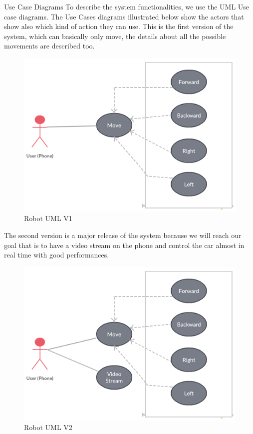 \documentclass[xcolor=table, 9pt]{beamer}
\begin{document}

\begin{frame}{Use Case Diagrams}
To describe the system functionalities, we use the UML Use case diagrams. The Use Cases diagrams
illustrated below show the actors that show also which kind of action they can use.
This is the first version of the system, which can basically only move, the details about all the possible movements are described too.
\begin{figure}
\includegraphics[width=0.6\linewidth]{RobotUML_V1.png}
\caption{Robot UML V1}
\end{figure}
\end{frame}
\begin{frame}
The second version is a major release of the system because we will reach our goal that is to have a video stream on the phone and control the car almost in real time with good performances.
\begin{figure}
\includegraphics[width=0.6\linewidth]{RobotUML_V2.png}
\caption{Robot UML V2}
\end{figure}
\end{frame}




\end{document}
